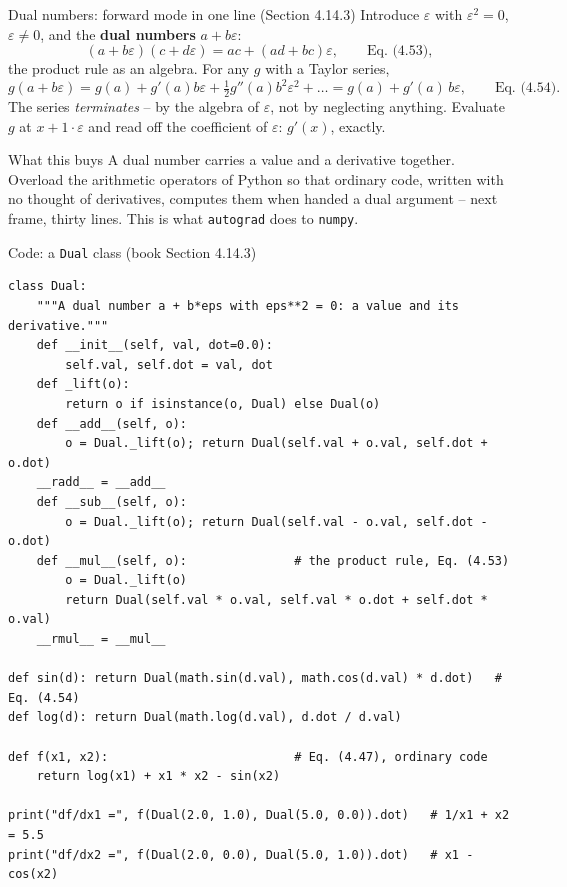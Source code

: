 \documentclass[10pt,aspectratio=169]{beamer}
\begin{document}
\begin{frame}{Dual numbers: forward mode in one line (Section 4.14.3)}
Introduce $\varepsilon$ with $\varepsilon^2=0$, $\varepsilon\ne0$, and the
\textbf{dual numbers} $a+b\varepsilon$:
\[
  (a+b\varepsilon)(c+d\varepsilon)=ac+(ad+bc)\varepsilon,\qquad\text{Eq.~(4.53)},
\]
the product rule as an algebra.  For any $g$ with a Taylor series,
\[
  g(a+b\varepsilon)=g(a)+g'(a)b\varepsilon+\tfrac12g''(a)b^2\varepsilon^2+\dots
  =g(a)+g'(a)\,b\varepsilon,\qquad\text{Eq.~(4.54)}.
\]
The series \emph{terminates} -- by the algebra of $\varepsilon$, not by
neglecting anything.  Evaluate $g$ at $x+1\cdot\varepsilon$ and read off the
coefficient of $\varepsilon$: $g'(x)$, exactly.
\vspace{4pt}
\begin{block}{What this buys}
A dual number carries a value and a derivative together.  Overload the
arithmetic operators of Python so that ordinary code, written with no thought
of derivatives, computes them when handed a dual argument -- next frame,
thirty lines.  This is what \texttt{autograd} does to \texttt{numpy}.
\end{block}
\end{frame}

\begin{frame}[fragile]{Code: a \texttt{Dual} class (book Section 4.14.3)}
\begin{lstlisting}
class Dual:
    """A dual number a + b*eps with eps**2 = 0: a value and its derivative."""
    def __init__(self, val, dot=0.0):
        self.val, self.dot = val, dot
    def _lift(o):
        return o if isinstance(o, Dual) else Dual(o)
    def __add__(self, o):
        o = Dual._lift(o); return Dual(self.val + o.val, self.dot + o.dot)
    __radd__ = __add__
    def __sub__(self, o):
        o = Dual._lift(o); return Dual(self.val - o.val, self.dot - o.dot)
    def __mul__(self, o):               # the product rule, Eq. (4.53)
        o = Dual._lift(o)
        return Dual(self.val * o.val, self.val * o.dot + self.dot * o.val)
    __rmul__ = __mul__

def sin(d): return Dual(math.sin(d.val), math.cos(d.val) * d.dot)   # Eq. (4.54)
def log(d): return Dual(math.log(d.val), d.dot / d.val)

def f(x1, x2):                          # Eq. (4.47), ordinary code
    return log(x1) + x1 * x2 - sin(x2)

print("df/dx1 =", f(Dual(2.0, 1.0), Dual(5.0, 0.0)).dot)   # 1/x1 + x2 = 5.5
print("df/dx2 =", f(Dual(2.0, 0.0), Dual(5.0, 1.0)).dot)   # x1 - cos(x2)
\end{lstlisting}
\end{frame}
\end{document}
